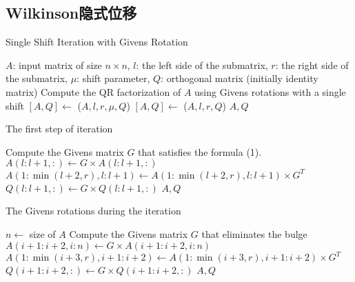 \documentclass[12pt, a4paper, oneside]{ctexart}
\begin{document}
\begin{appendices}
    \renewcommand{\thesection}{\Alph{section}}
    \section{Wilkinson隐式位移}
    \begin{algorithm}
        \caption{Single Shift Iteration with Givens Rotation}
        \begin{algorithmic}[1]
            \Require $A$: input matrix of size $n \times n$, $l$: the left side of the submatrix, $r$: the right side of the submatrix, $\mu$: shift parameter, $Q$: orthogonal matrix (initially identity matrix)
            \Ensure Compute the QR factorization of $A$ using Givens rotations with a single shift
                \State $[A, Q] \gets$ ($A, l, r, \mu, Q$)
                \State $[A, Q] \gets$ ($A, l, r, Q$)
                \State \Return $A, Q$
            \EndFunction
        \end{algorithmic}
    \end{algorithm}
    \begin{algorithm}
        \caption{The first step of iteration}
        \begin{algorithmic}[1]
                \State Compute the Givens matrix $G$ that satisfies the formula (1).
                \State $A(l:l+1, :) \gets G \times A(l:l+1, :)$
                \State $A(1:\min(l+2, r), l:l+1) \gets A(1:\min(l+2, r), l:l+1) \times G^T$
                \State $Q(l:l+1, :) \gets G \times Q(l:l+1, :)$
                \State \Return $A, Q$
            \EndFunction
        \end{algorithmic}
    \end{algorithm}
    \begin{algorithm}
        \caption{The Givens rotations during the iteration}
        \begin{algorithmic}[1]
                \State $n \gets$ size of $A$
                    \State Compute the Givens matrix $G$ that eliminates the bulge
                    \State $A(i+1:i+2, i:n) \gets G \times A(i+1:i+2, i:n)$
                    \State $A(1:\min(i+3, r), i+1:i+2) \gets A(1:\min(i+3, r), i+1:i+2) \times G^T$
                    \State $Q(i+1:i+2, :) \gets G \times Q(i+1:i+2, :)$
                \EndFor
                \State \Return $A, Q$
            \EndFunction
        \end{algorithmic}
    \end{algorithm}
\end{appendices}
\end{document}
